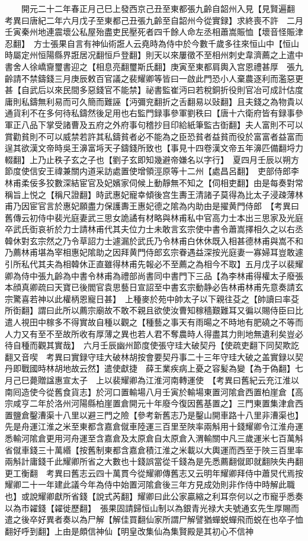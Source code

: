 　　開元二十二年春正月己巳上發西京己丑至東都張九齡自韶州入見【見賢遍翻　考異曰唐紀二年六月戊子至東都己丑張九齡至自韶州今從實録】求終喪不許　二月壬寅秦州地連震壞公私屋殆盡吏民壓死者四千餘人命左丞相蕭嵩賑恤【壞音怪賑津忍翻】　方士張果自言有神仙術誑人云堯時為侍中於今數千歲多往來恒山中【恒山時屬定州恒陽縣界誑居况翻恒戶登翻】則天以來屢徵不至相州刺史韋濟薦之上遣中書舍人徐嶠齎璽書迎之【相息亮翻璽斯氏翻】庚寅至東都肩輿入宫恩禮甚厚　張九齡請不禁鑄錢三月庚辰敕百官議之裴耀卿等皆曰一啟此門恐小人棄農逐利而濫惡更甚【自武后以來民間多惡錢官不能禁】祕書監崔沔曰若稅銅折役則官冶可成計估度庸則私鑄無利易而可久簡而難誣【沔彌兖翻折之舌翻易以䜴翻】且夫錢之為物貴以通貨利不在多何待私鑄然後足用也右監門録事參軍劉秩曰【唐十六衛府皆有録事參軍正八品下掌受諸曹及五府之外府事句稽抄目印給紙筆監古衘翻】夫人富則不可以賞勸貧則不可以威禁若許其私鑄貧者必不能為之臣恐貧者益貧而役於富富者益富而逞其欲漢文帝時吳王濞富埓天子鑄錢所致也【事見十四卷漢文帝五年濞匹備翻埒力輟翻】上乃止秩子玄之子也【劉子玄即知幾避帝嫌名以字行】　夏四月壬辰以朔方節度使信安王禕兼關内道采訪處置使增領涇原等十二州【處昌呂翻】　吏部侍郎李林甫柔佞多狡數深結宦官及妃嬪家伺候上動靜無不知之【伺相吏翻】由是每奏對常稱旨上悦之【稱尺證翻】時武惠妃寵幸傾後宫生夀王清諸子莫得為比太子浸疎薄林甫乃因宦官言於惠妃願盡力保護夀王惠妃德之隂為内助由是擢黄門侍郎　【考異曰舊傳云初侍中裴光庭妻武三思女詭譎有材略與林甫私中官高力士本出三思家及光庭卒武氏衘哀祈於力士請林甫代其夫位力士未敢言玄宗使中書令蕭嵩擇相久之以右丞韓休對玄宗然之乃令草詔力士遽漏於武氏乃令林甫白休休既入相甚德林甫與嵩不和乃薦林甫堪為宰相惠妃隂助之因拜黄門侍郎玄宗眷遇益深按光庭妻一寡婦耳豈敢遽引所私代其夫為相韓休正直雖得林甫先報必不至薦之為相今不取】五月戊子以裴耀卿為侍中張九齡為中書令林甫為禮部尚書同中書門下三品【為李林甫得權太子廢張本顔真卿疏曰天寶已後閻官袁思藝日宣詔至中書玄宗動静必告林甫林甫先意奏請玄宗驚喜若神以此權柄恩寵日甚】　上種麥於苑中帥太子以下親往芟之【帥讀曰率芟所衘翻】謂曰此所以薦宗廟故不敢不親且欲使汝曹知稼穡艱難耳又徧以賜侍臣曰比遣人視田中稼多不得實故自種以觀之【種藝之事天有雨暘之不時地有肥磽之不等而人力又有至不至故所收有厚薄之異也若人君不奪農時人得盡其力則地無遺利矣豈必待自種而觀其實哉】　六月壬辰幽州節度使張守珪大破契丹【使疏吏翻下同契欺訖翻又音喫　考異曰實録守珪大破林胡按會要契丹事二十三年守珪大破之盖實録以契丹即戰國時林胡地故云然】遣使獻捷　薛王業疾病上憂之容髪為變【為于偽翻】七月己巳薨贈諡惠宣太子　上以裴耀卿為江淮河南轉運使　【考異曰舊紀云充江淮以南囘造使今從舊食貨志】於河口置輸場八月壬寅於輸場東置河隂倉西置柏崖倉【高宗咸亨二年於洛州河陽縣柏崖置倉開元十年廢今復因舊基置之】三門東置集津倉西置鹽倉鑿漕渠十八里以避三門之險【參考新舊志乃是鑿山開車路十八里非漕渠也】先是舟運江淮之米至東都含嘉倉僦車陸運三百里至陜率兩斛用十錢耀卿令江淮舟運悉輸河隂倉更用河舟運至含嘉倉及太原倉自太原倉入渭輸關中凡三歲運米七百萬斛省僦車錢三十萬緡【按舊制東都含嘉倉積江淮之米載以大輿運而西至于陜三百里率兩斛計庸錢千此耀卿所省之大數也十錢誤當從千錢為是先悉薦翻僦即就翻陜失冉翻更工衡翻　考異曰舊志云四十萬貫今從耀卿傳舊志又云明年耀卿拜侍中蕭炅代焉按耀卿二十一年建此議今年為侍中始置河隂倉後三年方見成効則非作侍中時解此職也】或說耀卿獻所省錢【說式芮翻】耀卿曰此公家贏縮之利耳奈何以之市寵乎悉奏以為市糴錢【糴徙歷翻】　張果固請歸恒山制以為銀青光禄大夫號通玄先生厚賜而遣之後卒好異者奏以為尸解【解佳買翻仙家所謂尸解譬猶蟬蜕蟬飛而蜕在也卒子恤翻好呼到翻】上由是頗信神仙【明皇改集仙為集賢殿是其初心不信神